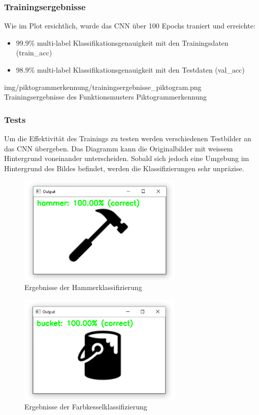 \subsubsection{Trainingsergebnisse}
Wie im Plot ersichtlich, wurde das CNN über 100 Epochs traniert und erreichte:
\begin{itemize}
    \item 99.9\% multi-label Klassifikationsgenauigkeit mit den Trainingsdaten (train\_acc)
    \item 98.9\% multi-label Klassifikationsgenauigkeit mit den Testdaten (val\_acc)
 \end{itemize}
 \image
   {img/piktogrammerkennung/trainingsergebnisse_piktogram.png}
   {Trainingsergebnisse des Funktionsmusters Piktogrammerkennung}
   
\subsubsection{Tests}
Um die Effektivität des Trainings zu testen werden verschiedenen Testbilder an das CNN übergeben. Das Diagramm kann die Originalbilder mit weissem Hintergrund voneinander unterscheiden. Sobald sich jedoch eine Umgebung im Hintergrund des Bildes befindet, werden die Klassifizierungen sehr unpräzise.

\begin{figure}[H]
  \includegraphics[width=0.7\textwidth]{img/piktogrammerkennung/classifiedHammer.PNG}
  \centering
  \caption{Ergebnisse der Hammerklassifizierung}
\end{figure}

\begin{figure}[H]
  \includegraphics[width=0.7\textwidth]{img/piktogrammerkennung/classifiedBucket.PNG}
  \centering
  \caption{Ergebnisse der Farbkesselklassifizierung}
\end{figure}

